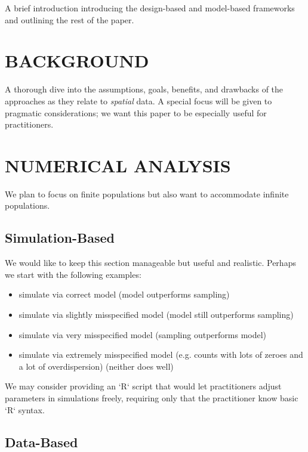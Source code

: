 A brief introduction introducing the design-based and model-based frameworks and outlining the rest of the paper. 

\section{\centering BACKGROUND}\label{sec:background}

A thorough dive into the assumptions, goals, benefits, and drawbacks of the approaches as they relate to \emph{spatial} data. A special focus will be given to pragmatic considerations; we want this paper to be especially useful for practitioners.

\section{\centering NUMERICAL ANALYSIS}\label{sec:numerical}

We plan to focus on finite populations but also want to accommodate infinite populations.

\subsection{Simulation-Based}

We would like to keep this section manageable but useful and realistic. Perhaps we start with the following examples: 
\begin{itemize}
  \item simulate via correct model (model outperforms sampling)
  \item simulate via slightly misspecified model (model still outperforms sampling)
  \item simulate via very misspecified model (sampling outperforms model)
  \item simulate via extremely misspecified model (e.g. counts with lots of zeroes and a lot of overdispersion) (neither does well)
\end{itemize}

We may consider providing an `R` script that would let practitioners adjust parameters in simulations freely, requiring only that the practitioner know basic `R` syntax.

\subsection{Data-Based}

